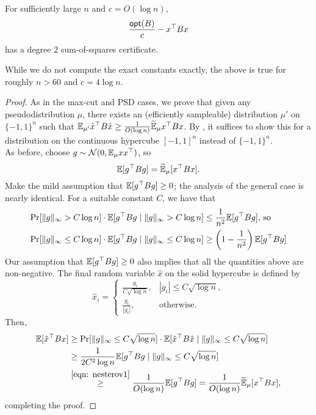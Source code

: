	\begin{ftheo}
		For sufficiently large $n$ and $c = O(\log n)$,
		\[ \frac{\mathsf{opt}(B)}{c} - x^\top B x \]
		has a degree $2$ sum-of-squares certificate.
	\end{ftheo}
	While we do not compute the exact constants exactly, the above is true for roughly $n > 60$ and $c = 4 \log n$.
	\begin{proof}
		As in the max-cut and PSD cases, we prove that given any pseudodistribution $\mu$, there exists an (efficiently sampleable) distribution $\mu'$ on $\{-1,1\}^n$ such that $\mathbb{E}_{\mu'} \hat{x}^\top B \hat{x} \ge \frac{1}{O(\log n)} \widetilde{\mathbb{E}}_\mu x^\top B x$. By , it suffices to show this for a distribution on the continuous hypercube $[-1,1]^n$ instead of $\{-1,1\}^n$.\\
		As before, choose $g \sim \mathcal{N}(0,\mathbb{E}_\mu xx^\top)$, so
		\[ \mathbb{E}[g^\top B g] = \widetilde{\mathbb{E}}_\mu [x^\top Bx]. \]
		Make the mild assumption that $\mathbb{E}[g^\top B g] \ge 0$; the analysis of the general case is nearly identical. For a suitable constant $C$, we have that
		\begin{align}
			\Pr[\|g\|_\infty > C \log n] \cdot \mathbb{E}[g^\top B g \mid \|g\|_\infty > C \log n] &\le \frac{1}{n^2} \mathbb{E}[g^\top B g] \text{, so} \nonumber \\
			\Pr[\|g\|_\infty \le C \log n] \cdot \mathbb{E}[g^\top B g \mid \|g\|_\infty \le C \log n] &\ge \left( 1 - \frac{1}{n^2} \right) \mathbb{E}[g^\top B g] \label{eqn: nesterov1}
		\end{align}
		Our assumption that $\mathbb{E}[g^\top B g] \ge 0$ also implies that all the quantities above are non-negative.
		The final random variable $\hat{x}$ on the solid hypercube is defined by
		\[ \hat{x}_i = \begin{cases} \frac{g_i}{C\sqrt{\log n}}, & |g_i| \le C\sqrt{\log n}, \\ \frac{g_i}{|g_i|}, & \text{otherwise.} \end{cases} \]
		Then,
		\begin{align*}
			\mathbb{E}[\hat{x}^\top B x] &\ge \Pr[\|g\|_\infty \le C\sqrt{\log n}] \cdot \mathbb{E}[\hat{x}^\top B \hat{x} \mid \|g\|_\infty \le C\sqrt{\log n}] \\
				&\ge \frac{1}{2C^2\log n}\mathbb{E}[g^\top B g \mid \|g\|_\infty \le C\sqrt{\log n}] \\
				&\stackrel{\eqref{eqn: nesterov1}}{\ge} \frac{1}{O(\log n)} \mathbb{E}[g^\top B g] = \frac{1}{O(\log n)} \widetilde{\mathbb{E}}_{\mu}[x^\top B x],
		\end{align*}
		completing the proof.
	\end{proof}


